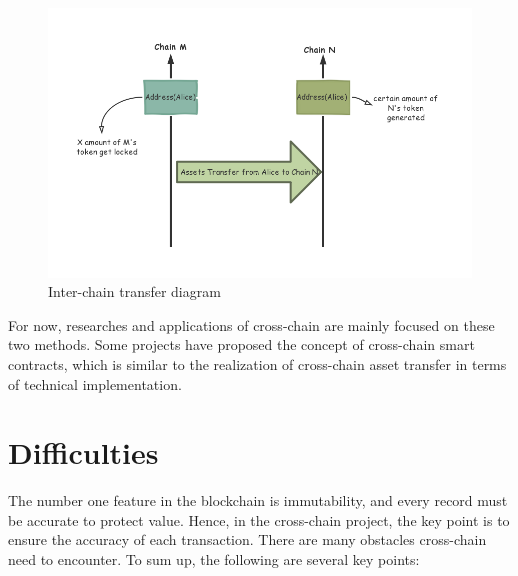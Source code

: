 \begin{enumerate}
    
    \begin{figure}[H]
    \includegraphics[width=1\textwidth]{./figures/transfer.png}
    \centering
    \caption{Inter-chain transfer diagram}%
    \centering
    \label{fig:transfer}
    \end{figure}
\end{enumerate}


\noindent For now, researches and applications of cross-chain are mainly focused on these two methods. Some projects have proposed the concept of cross-chain smart contracts, which is similar to the realization of cross-chain asset transfer in terms of technical implementation.

\section{Difficulties}
\label{sec:diff}
\noindent The number one feature in the blockchain is immutability, and every record must be accurate to protect value. Hence, in the cross-chain project, the key point is to ensure the accuracy of each transaction. There are many obstacles cross-chain need to encounter. To sum up, the following are several key points:

